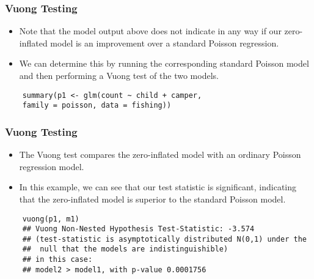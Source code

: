 \documentclass[MASTER.tex]{subfiles}
\begin{document}
\begin{frame}[fragile]
\frametitle{Vuong Testing}
	\begin{itemize}
		\item Note that the model output above does not indicate in any way if our zero-inflated model is an improvement over a standard Poisson regression. 
		\item We can determine this by running the corresponding standard Poisson model and then performing a Vuong test of the two models.
	\end{itemize}
	\begin{verbatim}
	summary(p1 <- glm(count ~ child + camper, 
	family = poisson, data = fishing))
	\end{verbatim}
\end{frame}
\begin{frame}[fragile]
	\frametitle{Vuong Testing}
	\large
	\begin{itemize}
		\item The Vuong test compares the zero-inflated model with an ordinary Poisson regression model. 
		\item In this example, we can see that our test statistic is significant, indicating that the zero-inflated model is superior to the standard Poisson model.
	\end{itemize}
\end{frame}
\begin{frame}[fragile]
	\large
	\begin{verbatim}
	vuong(p1, m1)
	## Vuong Non-Nested Hypothesis Test-Statistic: -3.574 
	## (test-statistic is asymptotically distributed N(0,1) under the
	##  null that the models are indistinguishible)
	## in this case:
	## model2 > model1, with p-value 0.0001756
	\end{verbatim}
\end{frame}
\end{document}
